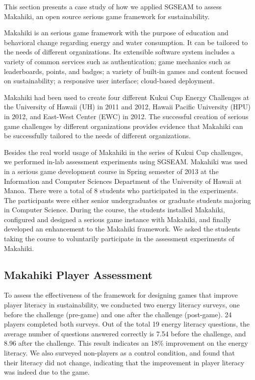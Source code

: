 \documentclass{sigchi}
\begin{document}
This section presents a case study of how we applied SGSEAM to assess Makahiki, an open source serious game framework for sustainability\cite{csdl2-12-06}.

Makahiki is an serious
game framework with the purpose of education and behavioral change regarding energy and water consumption. It can be tailored to the needs of different organizations.
Its extensible software system includes a variety of common services such as authentication; game mechanics such as leaderboards, points, and badges; a variety of built-in games and
content focused on sustainability; a responsive user interface; cloud-based deployment.

Makahiki had been used to create four different Kukui Cup Energy Challenges at the University of Hawaii (UH) in 2011 and 2012, Hawaii Pacific University (HPU) in 2012, and East-West Center (EWC) in 2012. 
The successful creation of serious game challenges by different organizations
provides evidence that Makahiki can be successfully tailored
to the needs of different organizations. 

Besides the real world usage of Makahiki in the series of Kukui Cup challenges, we
performed in-lab assessment experiments using SGSEAM. Makahiki was used in a serious game
development course in Spring semester of 2013 at the Information and Computer Sciences
Department of the University of Hawaii at Manoa. There were a total of 8 students who
participated in the experiments.  The participants were either senior undergraduates or
graduate students majoring in Computer Science. During the course, the students installed
Makahiki, configured and designed a serious game instance with Makahiki, and finally
developed an enhancement to the Makahiki framework. We asked the students taking the
course to voluntarily participate in the assessment experiments of Makahiki.

\subsection{Makahiki Player Assessment}

To assess the effectiveness of the framework for designing games that improve player literacy in sustainability, we
conducted two energy literacy surveys, one before the challenge (pre-game) and one after
the challenge (post-game). 24 players completed both surveys. Out of the total 19 energy
literacy questions, the average number of questions answered correctly is 7.54 before the
challenge, and 8.96 after the challenge. This result indicates an 18\% improvement on the
energy literacy.  We also surveyed non-players as a control condition, and found that
their literacy did not change, indicating that the improvement in player literacy was
indeed due to the game. 
\end{document}
